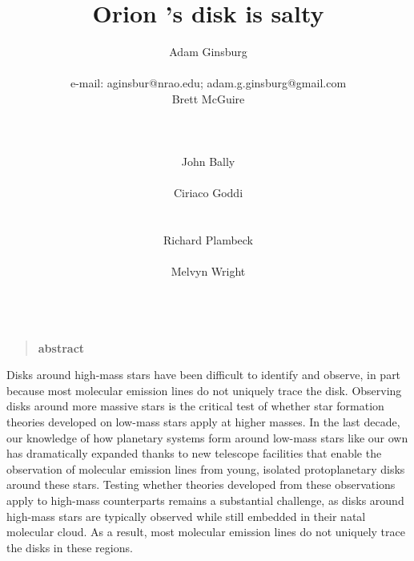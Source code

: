 \documentclass[12pt]{article}
\date{}
\author{
Adam Ginsburg\\
\nraojansky\\
e-mail: aginsbur@nrao.edu; adam.g.ginsburg@gmail.com\\
Brett McGuire\\
\hubble\\
\nraocv\\
\cfa\\
John Bally\\
\casa\\
Ciriaco Goddi\\
\allegro\\
\radboud\\
Richard Plambeck\\
\berkeley\\
Melvyn Wright\\
\berkeley\\
}
\title{Orion \sourcei's disk is salty}
\newenvironment{sciabstract}{%
\begin{quote} \bf  }
{\end{quote}}
\newcommand{\bam}[1]{\textcolor{green!65!black}{\textbf{[BAM: #1]}}}
\begin{document}


\maketitle

\begin{sciabstract}
    abstract
\end{sciabstract}




Disks around high-mass stars have been difficult to identify and observe, in
part because most molecular emission lines do not uniquely trace the disk.
Observing disks around more massive stars is the critical test of whether star
formation theories developed on low-mass stars apply at higher masses. 
In the last decade, our knowledge of how planetary systems form around
low-mass stars like our own has dramatically expanded thanks to new telescope
facilities that enable the observation of molecular emission lines from young,
isolated protoplanetary disks around these stars.  Testing whether theories
developed from these observations apply to high-mass counterparts remains a
substantial challenge, as disks around high-mass stars are typically observed
while still embedded in their natal molecular cloud.  As a result, most
molecular emission lines do not uniquely trace the disks in these regions.
\end{document}
